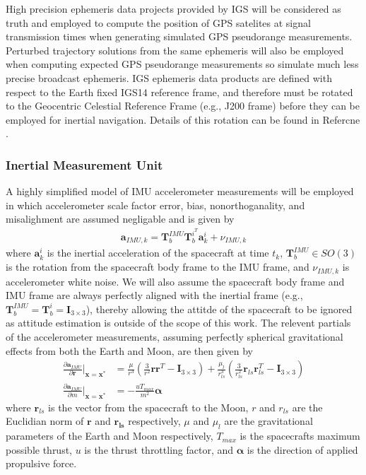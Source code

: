 \documentclass[letterpaper, submit]{AAS}			%
\begin{document}
High precision ephemeris data projects provided by IGS \cite{IGSproducts} will be considered as truth and employed to compute the position of GPS satelites at signal transmission times when generating simulated GPS pseudorange measurements. Perturbed trajectory solutions from the same ephemeris will also be employed when computing expected GPS pseudorange measurements so simulate much less precise broadcast ephemeris. IGS ephemeris data products are defined with respect to the Earth fixed IGS14 reference frame, and therefore must be rotated to the Geocentric Celestial Reference Frame (e.g., J200 frame) before they can be employed for inertial navigation. Details of this rotation can be found in Refercne .

\subsubsection{Inertial Measurement Unit}
A highly simplified model of IMU accelerometer measurements will be employed in which accelerometer scale factor error, bias, nonorthoganality, and misalighment are assumed negligable and is given by
\begin{align}
	\mathbf{a}_{IMU,k} = \mathbf{T}_b^{IMU}\mathbf{T}_b^{i^T}\mathbf{a}_k^i + \nu_{IMU,k}
\end{align}
where $\mathbf{a}_k^i$ is the inertial acceleration of the spacecraft at time $t_k$, $\mathbf{T}_b^{IMU}\in SO(3)$ is the rotation from the spacecraft body frame to the IMU frame, and $\nu_{IMU,k}$ is accelerometer white noise. We will also assume the spacecraft body frame and IMU frame are always perfectly aligned with the inertial frame (e.g., $\mathbf{T}_b^{IMU} = \mathbf{T}_b^i = \mathbf{I}_{3\times3}$), thereby allowing the attitde of the spacecraft to be ignored as attitude estimation is outside of the scope of this work. The relevent partials of the accelerometer measurements, assuming perfectly spherical gravitational effects from both the Earth and Moon, are then given by
\begin{align}
	\frac{\partial \mathbf{a}_{IMU}}{\partial \mathbf{r}}\bigg|_{\mathbf{x}=\mathbf{x}^*} &= \frac{\mu}{r^3}\left(\frac{3}{r^2}\mathbf{r}\mathbf{r}^T - \mathbf{I}_{3\times3}\right) + \frac{\mu_l}{r_{ls}^3}\left(\frac{3}{r_{ls}^2}\mathbf{r}_{ls}\mathbf{r}_{ls}^T - \mathbf{I}_{3\times3}\right) \\
	\frac{\partial \mathbf{a}_{IMU}}{\partial m}\bigg|_{\mathbf{x}=\mathbf{x}^*} &= -\frac{u T_{max}}{m^2}\boldsymbol{\alpha}
\end{align}
where $\mathbf{r}_{ls}$ is the vector from the spacecraft to the Moon, $r$ and $r_{ls}$ are the Euclidian norm of $\mathbf{r}$ and $\mathbf{r_{ls}}$ respectively, $\mu$ and $\mu_l$ are the gravitational parameters of the Earth and Moon respectively, $T_{max}$ is the spacecrafts maximum possible thrust, $u$ is the thrust throttling factor, and $\boldsymbol{\alpha}$ is the direction of applied propulsive force.
\end{document}
